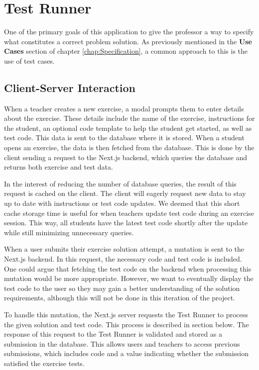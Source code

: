 \chapter{Test Runner} \label{chap:TestRunner}
One of the primary goals of this application to give the professor a way to specify what constitutes a correct problem solution.
As previously mentioned in the \textbf{Use Cases} section of chapter \ref{chap:Specification}, a common approach to this is the use of test cases.

\section{Client-Server Interaction}
When a teacher creates a new exercise, a modal prompts them to enter details about the exercise.
These details include the name of the exercise, instructions for the student, an optional code template to help the student get started, as well as test code.
This data is sent to the database where it is stored.
When a student opens an exercise, the data is then fetched from the database.
This is done by the client sending a request to the Next.js backend, which queries the database and returns both exercise and test data.

In the interest of reducing the number of database queries, the result of this request is cached on the client.
The client will eagerly request new data to stay up to date with instructions or test code updates.
We deemed that this short cache storage time is useful for when teachers update test code during an exercise session.
This way, all students have the latest test code shortly after the update while still minimizing unnecessary queries.

When a user submits their exercise solution attempt, a mutation is sent to the Next.js backend.
In this request, the necessary code and test code is included.
One could argue that fetching the test code on the backend when processing this mutation would be more appropriate.
However, we want to eventually display the test code to the user so they may gain a better understanding of the solution requirements, although this will not be done in this iteration of the project.

To handle this mutation, the Next.js server requests the Test Runner to process the given solution and test code.
This process is described in section \label{sec:test_runner_process} below.
The response of this request to the Test Runner is validated and stored as a submission in the database.
This allows users and teachers to access previous submissions, which includes code and a value indicating whether the submission satisfied the exercise tests.

